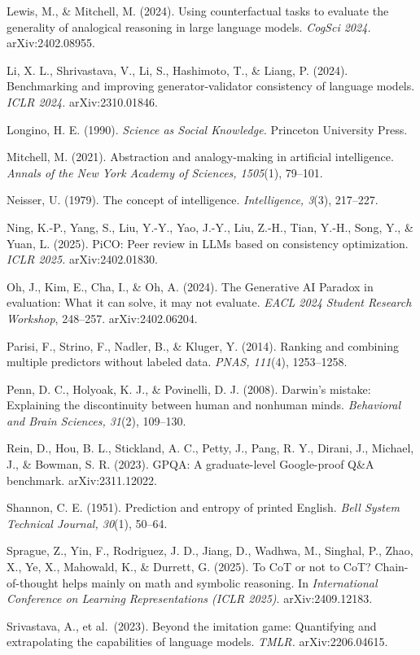 \documentclass{article}
\begin{document}
Lewis, M., \& Mitchell, M. (2024). Using counterfactual tasks to evaluate the generality of analogical reasoning in large language models. \emph{CogSci 2024.} arXiv:2402.08955.

Li, X. L., Shrivastava, V., Li, S., Hashimoto, T., \& Liang, P. (2024). Benchmarking and improving generator-validator consistency of language models. \emph{ICLR 2024.} arXiv:2310.01846.

Longino, H. E. (1990). \emph{Science as Social Knowledge.} Princeton University Press.

Mitchell, M. (2021). Abstraction and analogy-making in artificial intelligence. \emph{Annals of the New York Academy of Sciences, 1505}(1), 79--101.

Neisser, U. (1979). The concept of intelligence. \emph{Intelligence, 3}(3), 217--227.

Ning, K.-P., Yang, S., Liu, Y.-Y., Yao, J.-Y., Liu, Z.-H., Tian, Y.-H., Song, Y., \& Yuan, L. (2025). PiCO: Peer review in LLMs based on consistency optimization. \emph{ICLR 2025.} arXiv:2402.01830.

Oh, J., Kim, E., Cha, I., \& Oh, A. (2024). The Generative AI Paradox in evaluation: What it can solve, it may not evaluate. \emph{EACL 2024 Student Research Workshop}, 248--257. arXiv:2402.06204.

Parisi, F., Strino, F., Nadler, B., \& Kluger, Y. (2014). Ranking and combining multiple predictors without labeled data. \emph{PNAS, 111}(4), 1253--1258.

Penn, D. C., Holyoak, K. J., \& Povinelli, D. J. (2008). Darwin's mistake: Explaining the discontinuity between human and nonhuman minds. \emph{Behavioral and Brain Sciences, 31}(2), 109--130.

Rein, D., Hou, B. L., Stickland, A. C., Petty, J., Pang, R. Y., Dirani, J., Michael, J., \& Bowman, S. R. (2023). GPQA: A graduate-level Google-proof Q\&A benchmark. arXiv:2311.12022.

Shannon, C. E. (1951). Prediction and entropy of printed English. \emph{Bell System Technical Journal, 30}(1), 50--64.

Sprague, Z., Yin, F., Rodriguez, J. D., Jiang, D., Wadhwa, M., Singhal, P., Zhao, X., Ye, X., Mahowald, K., \& Durrett, G. (2025). To CoT or not to CoT? Chain-of-thought helps mainly on math and symbolic reasoning. In \emph{International Conference on Learning Representations (ICLR 2025)}. arXiv:2409.12183.

Srivastava, A., et al.~(2023). Beyond the imitation game: Quantifying and extrapolating the capabilities of language models. \emph{TMLR.} arXiv:2206.04615.
\end{document}
